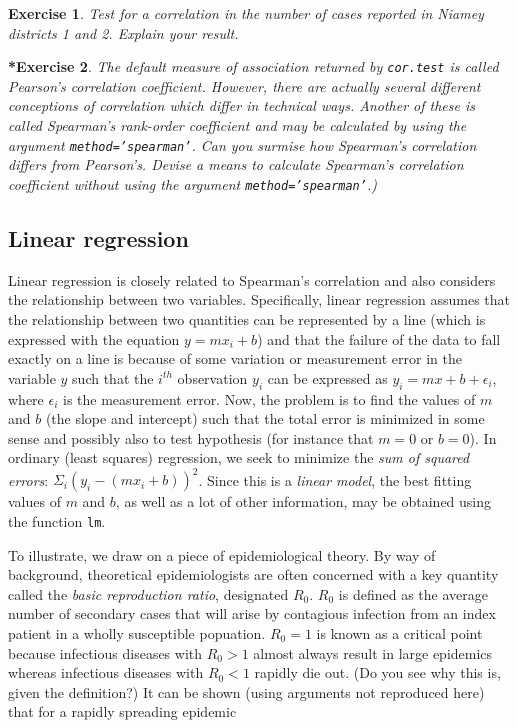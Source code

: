 \documentclass{article}\usepackage[]{graphicx}\usepackage[]{color}
\newcommand{\code}[1]{\texttt{#1}}
\theoremstyle{exercise}
\newtheorem{exercise}{Exercise}
\newtheorem{challenge}[exercise]{*Exercise}
\begin{document}
\begin{exercise}
Test for a correlation in the number of cases reported in Niamey districts 1 and 2. Explain your result.
\end{exercise}

\begin{challenge}
The default measure of association returned by \code{cor.test} is called \textit{Pearson's correlation coefficient}. However, there are actually several different conceptions of correlation which differ in technical ways. Another of these is called \textit{Spearman's rank-order coefficient} and may be calculated by using the argument \code{method='spearman'}. Can you surmise how Spearman's correlation differs from Pearson's. Devise a means to calculate Spearman's correlation coefficient without using the argument \code{method='spearman'}.)
\end{challenge}

\subsection{Linear regression}
Linear regression is closely related to Spearman's correlation and also considers the relationship between two variables. Specifically, linear regression assumes that the relationship between two quantities can be represented by a line (which is expressed with the equation $y=mx_i+b$) and that the failure of the data to fall exactly on a line is because of some variation or measurement error in the variable $y$ such that the $i^{th}$ observation $y_i$ can be expressed as $y_i=mx+b+\epsilon_i$, where $\epsilon_i$ is the measurement error. Now, the problem is to find the values of $m$ and $b$ (the slope and intercept) such that the total error is minimized in some sense and possibly also to test hypothesis (for instance that $m=0$ or $b=0$). In ordinary (least squares) regression, we seek to minimize the \textit{sum of squared errors}: $\Sigma_i (y_i-(mx_i+b))^2$. Since this is a \textit{linear model}, the best fitting values of $m$ and $b$, as well as a lot of other information, may be obtained using the function \code{lm}.

To illustrate, we draw on a piece of epidemiological theory. By way of background, theoretical epidemiologists are often concerned with a key quantity called the \textit{basic reproduction ratio}, designated $R_0$. $R_0$ is defined as the average number of secondary cases that will arise by contagious infection from an index patient in a wholly susceptible popuation. $R_0=1$ is known as a critical point because infectious diseases with $R_0>1$ almost always result in large epidemics whereas infectious diseases with $R_0<1$ rapidly die out. (Do you see why this is, given the definition?) It can be shown (using arguments not reproduced here) that for a rapidly spreading epidemic
\end{document}
